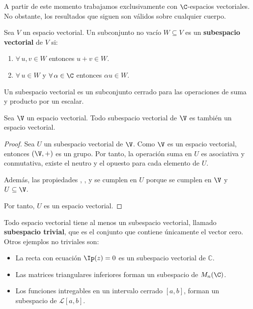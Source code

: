 A partir de este momento trabajamos exclusivamente con $\C$-espacios vectoriales. No obstante, los resultados que siguen son válidos sobre cualquier cuerpo.

\begin{defi}
  Sea $V$ un espacio vectorial. Un subconjunto no vacío $W\subseteq V$ es un \textbf{subespacio vectorial} de $V$ si:
  \begin{enumerate}
    \item[\likeitem{S1}] $\forall\, u,v\in W$ entonces $u+v\in W$.
    \item[\likeitem{S2}] $\forall\, u\in W$ y $\forall\, \alpha\in\C$ entonces $\alpha u\in W$.
  \end{enumerate}
\end{defi}

Un subespacio vectorial es un subconjunto cerrado para las operaciones de suma y producto por un escalar.

\begin{prop}
  Sea $\V$ un espacio vectorial.
  Todo subespacio vectorial de $\V$ es también un espacio vectorial.
\end{prop}
\begin{proof}
  Sea $U$ un subespacio vectorial de $\V$. Como $\V$ es un espacio vectorial, entonces $(\V, +)$ es un grupo. Por tanto, la operación suma en $U$ es asociativa y conmutativa, existe el neutro y el opuesto para cada elemento de $U$.

  Además, las propiedades , ,  y  se cumplen en $U$ porque se cumplen en $\V$ y $U \subseteq \V$.

  Por tanto, $U$ es un espacio vectorial.
\end{proof}

\begin{eje}
  Todo espacio vectorial tiene al menos un subespacio vectorial, llamado \textbf{subespacio trivial}, que es el conjunto que contiene únicamente el vector cero. Otros ejemplos no triviales son:
  \begin{itemize}
    \item La recta con ecuación \(\Ip(z) = 0\) es un subespacio vectorial de \(\mathbb{C}\).
    \item Las matrices triangulares inferiores forman un subespacio de \({M}_{n}(\C)\).
    \item Los funciones intregables en un intervalo cerrado $[a,b]$, forman un subespacio de \(\mathcal{L}[a,b]\).
  \end{itemize}
\end{eje}

